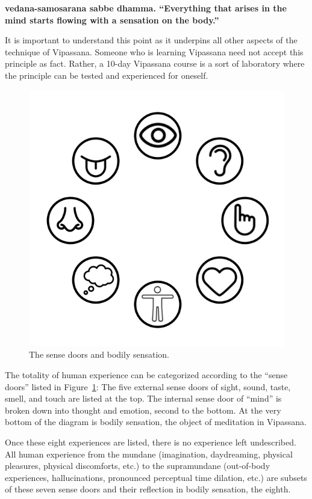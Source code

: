 \documentclass[a4paper, amsfonts, amssymb, amsmath, reprint, showkeys, nofootinbib, twoside]{revtex4-1}
\begin{document}
\cite{hauke2018}

\textbf{vedana-samosarana sabbe dhamma. ``Everything
that arises in the mind starts flowing with a sensation
on the body.''} \cite{goenka1999discourses}

It is important to understand this point as it underpins all other aspects of the
technique of Vipassana. Someone who is learning Vipassana need not accept this
principle as fact. Rather, a 10-day Vipassana course is a sort of laboratory where the
principle can be tested and experienced for oneself.

\begin{figure}[H]
  \centering
  \includegraphics[width=0.8\linewidth]{images/sense-doors.png}
  \caption{The sense doors and bodily sensation. \cite{sense-icons}}
  \label{fig:sense-doors}
\end{figure}

The totality of human experience can be categorized according to the ``sense doors''
listed in Figure~\ref{fig:sense-doors}: The five external sense doors of sight, sound,
taste, smell, and touch are listed at the top. The internal sense door of ``mind'' is
broken down into thought and emotion, second to the bottom. At the very bottom of the
diagram is bodily sensation, the object of meditation in Vipassana.

Once these eight experiences are listed, there is no experience left undescribed. All
human experience from the mundane (imagination, daydreaming, physical pleasures,
physical discomforts, etc.) to the supramundane (out-of-body experiences,
hallucinations, pronounced perceptual time dilation, etc.) are subsets of these seven
sense doors and their reflection in bodily sensation, the eighth.
\end{document}
